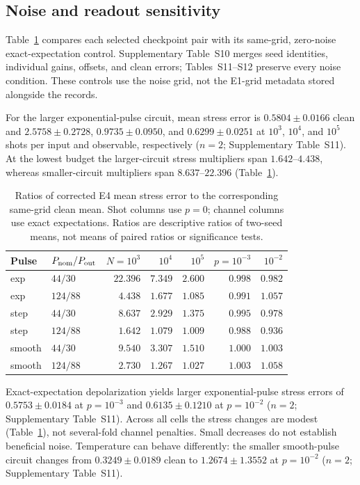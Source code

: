 \documentclass[11pt]{article}
\begin{document}
\subsection{Noise and readout sensitivity}

Table~\ref{tab:e4ratios} compares each selected checkpoint pair with its
same-grid, zero-noise exact-expectation control. Supplementary Table~S10
merges seed identities, individual gains, offsets, and clean errors;
Tables~S11--S12 preserve every noise condition. These controls use the
noise grid, not the E1-grid metadata stored alongside the records.

For the larger exponential-pulse circuit, mean stress error is
$0.5804\pm0.0166$ clean and $2.5758\pm0.2728$, $0.9735\pm0.0950$, and
$0.6299\pm0.0251$ at $10^3$, $10^4$, and $10^5$ shots per input and
observable, respectively ($n=2$; Supplementary Table~S11). At the lowest
budget the larger-circuit stress multipliers span $1.642$--$4.438$,
whereas smaller-circuit multipliers span $8.637$--$22.396$
(Table~\ref{tab:e4ratios}).

\begin{table}[htbp]
\centering
\caption{Ratios of corrected E4 mean stress error to the corresponding same-grid clean mean. Shot columns use $p=0$; channel columns use exact expectations. Ratios are descriptive ratios of two-seed means, not means of paired ratios or significance tests.}
\label{tab:e4ratios}
\small
\setlength{\tabcolsep}{4pt}
\begin{tabular}{llrrrrr}
\toprule
Pulse & $P_{\rm nom}/P_{\rm out}$ & $N=10^3$ & $10^4$ & $10^5$ & $p=10^{-3}$ & $10^{-2}$ \\
\midrule
exp & $44/30$ & $22.396$ & $7.349$ & $2.600$ & $0.998$ & $0.982$ \\
exp & $124/88$ & $4.438$ & $1.677$ & $1.085$ & $0.991$ & $1.057$ \\
step & $44/30$ & $8.637$ & $2.929$ & $1.375$ & $0.995$ & $0.978$ \\
step & $124/88$ & $1.642$ & $1.079$ & $1.009$ & $0.988$ & $0.936$ \\
smooth & $44/30$ & $9.540$ & $3.307$ & $1.510$ & $1.000$ & $1.003$ \\
smooth & $124/88$ & $2.730$ & $1.267$ & $1.027$ & $1.003$ & $1.058$ \\
\bottomrule
\end{tabular}
\end{table}

Exact-expectation depolarization yields larger exponential-pulse stress
errors of $0.5753\pm0.0184$ at $p=10^{-3}$ and $0.6135\pm0.1210$ at
$p=10^{-2}$ ($n=2$; Supplementary Table~S11). Across all cells the
stress changes are modest (Table~\ref{tab:e4ratios}), not several-fold
channel penalties. Small decreases do not establish beneficial noise.
Temperature can behave differently: the smaller smooth-pulse circuit
changes from $0.3249\pm0.0189$ clean to $1.2674\pm1.3552$ at
$p=10^{-2}$ ($n=2$; Supplementary Table~S11).
\end{document}
